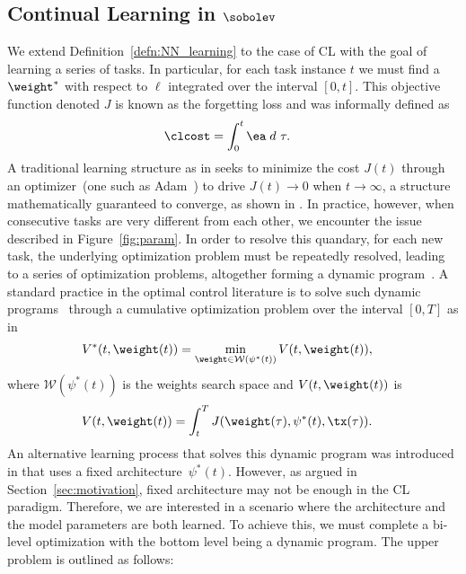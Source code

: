 \subsection*{Continual Learning in $\sobolev$}
We  extend Definition~\ref{defn:NN_learning} to the case of CL  with the goal of learning a series of tasks. In particular, for each task instance $t$ we must find a $\weight^*$  with respect to  $\ell$ integrated over the interval $[0,t].$   This objective function denoted $J$ is known as the forgetting loss and was informally defined as 
\begin{align*}
    \clcost & = \int_0^t \ea \;  d~\tau .
\end{align*}
A traditional learning structure as in \cite{CASpasunuru2019continual} seeks to minimize the cost $J(t)$ through an  optimizer~(one such as Adam~\cite{kingmaAdamMethodStochastic2017}) to drive $J(t) \rightarrow 0$  when $t \rightarrow \infty$,  a structure mathematically guaranteed to converge, as shown in \cite{kingmaAdamMethodStochastic2017}. In practice,  however, when consecutive tasks are very different from each other,  we encounter the issue described in Figure~\ref{fig:param}.  In order to resolve this quandary, for each new task, the underlying optimization problem must be repeatedly resolved, leading to a  series of optimization problems, altogether forming a dynamic program~\cite{bertsekas2012dynamic}. A standard practice in the optimal control literature is to solve such dynamic programs~\cite{bertsekas2012dynamic} through a cumulative optimization problem over the interval $[0,T]$ as in 
\begin{align*}
    V^*(t,\weight(t)) & = \min_{\weight \in \mathcal{W}(\psi^*(t))} V(t, \weight(t) ),
\end{align*}
where $\mathcal{W}(\psi^*(t))$ is the weights search space and $V(t,\weight(t))$ is 
\begin{align*}
    V(t,\weight(t)) & = \int_t^T J(\weight(\tau),\psi^*(t), \tx(\tau)).
\end{align*}
An alternative learning process that solves this dynamic program was introduced in   \cite{raghavan2021formalizing, chakraborty2025understanding} that uses a fixed architecture~$\psi^*(t)$.  However, as argued in Section~\ref{sec:motivation}, fixed architecture may not be enough in the CL paradigm. Therefore, we are interested in a scenario where the architecture and the model parameters are both learned. To achieve this, we must complete a bi-level optimization with the bottom level being a dynamic program. The upper problem is outlined as follows:
